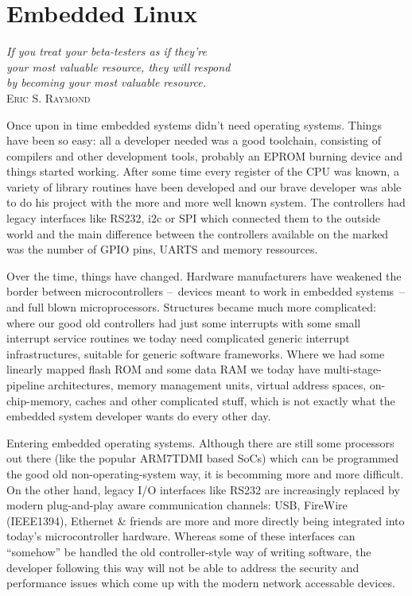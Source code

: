 \chapter{Embedded Linux} 			\label{chap:embedded-linux}

\begin{flushright}
\emph{
If you treat your beta-testers as if they're \\
your most valuable resource, they will respond \\
by becoming your most valuable resource.\\
}
\textsc{\small Eric S. Raymond}
\end{flushright}

Once upon in time embedded systems didn't need operating systems. Things
have been so easy: all a developer needed was a good toolchain,
consisting of compilers and other development tools, probably an EPROM
burning device and things started working. After some time every
register of the CPU was known, a variety of library routines have been
developed and our brave developer was able to do his project with the
more and more well known system. The controllers had legacy interfaces
like RS232, i2c or SPI which connected them to the outside world and the
main difference between the controllers available on the marked was the
number of GPIO pins, UARTS and memory ressources. 

Over the time, things have changed. Hardware manufacturers have weakened
the border between microcontrollers --~devices meant to work in embedded
systems~-- and full blown microprocessors. Structures became much more
complicated: where our good old controllers had just some interrupts
with some small interrupt service routines we today need complicated
generic interrupt infrastructures, suitable for generic software
frameworks. Where we had some linearly mapped flash ROM and some data
RAM we today have multi-stage-pipeline architectures, memory management
units, virtual address spaces, on-chip-memory, caches and other
complicated stuff, which is not exactly what the embedded system
developer wants do every other day. 

Entering embedded operating systems. Although there are still some
processors out there (like the popular ARM7TDMI based SoCs) which can be
programmed the good old non-operating-system way, it is becomming more
and more difficult. On the other hand, legacy I/O interfaces like RS232
are increasingly replaced by modern plug-and-play aware communication
channels: USB, FireWire (IEEE1394), Ethernet \& friends are more and
more directly being integrated into today's microcontroller hardware.
Whereas some of these interfaces can "`somehow"' be handled the old
controller-style way of writing software, the developer following this
way will not be able to address the security and performance issues
which come up with the modern network accessable devices.

